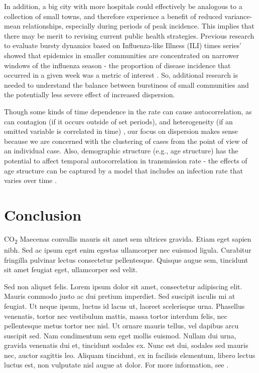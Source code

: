 \documentclass[10pt,letterpaper]{article}
\begin{document}
In addition, a big city with more hospitals could effectively be analogous to a collection of small towns, and therefore experience a benefit of reduced variance-mean relationships, especially during periods of peak incidence.
This implies that there may be merit to revising current public health strategies. 
Previous research to evaluate bursty dynamics based on Influenza-like Illness (ILI) times series’ showed that epidemics in smaller communities are concentrated on narrower windows of the influenza season - the proportion of disease incidence that occurred in a given week was a metric of interest \cite{dalziel_urbanization_2018}. 
So, additional research is needed to understand the balance between burstiness of small communities and the potentially less severe effect of increased dispersion.

Though some kinds of time dependence in the rate can cause autocorrelation, as can contagion (if it occurs outside of set periods), and heterogeneity (if an omitted variable is correlated in time) \cite{barron_analysis_1992}, our focus on dispersion makes sense because we are concerned with the clustering of cases from the point of view of an individual case. Also, demographic structure (e.g., age structure) has the potential to affect temporal autocorrelation in transmission rate - the effects of age structure can be captured by a model that includes an infection rate that varies over time \cite{earn_dynamic_nodate}. 

\section*{Conclusion}

CO\textsubscript{2} Maecenas convallis mauris sit amet sem ultrices gravida. Etiam eget sapien nibh. Sed ac ipsum eget enim egestas ullamcorper nec euismod ligula. Curabitur fringilla pulvinar lectus consectetur pellentesque. Quisque augue sem, tincidunt sit amet feugiat eget, ullamcorper sed velit. 

Sed non aliquet felis. Lorem ipsum dolor sit amet, consectetur adipiscing elit. Mauris commodo justo ac dui pretium imperdiet. Sed suscipit iaculis mi at feugiat. Ut neque ipsum, luctus id lacus ut, laoreet scelerisque urna. Phasellus venenatis, tortor nec vestibulum mattis, massa tortor interdum felis, nec pellentesque metus tortor nec nisl. Ut ornare mauris tellus, vel dapibus arcu suscipit sed. Nam condimentum sem eget mollis euismod. Nullam dui urna, gravida venenatis dui et, tincidunt sodales ex. Nunc est dui, sodales sed mauris nec, auctor sagittis leo. Aliquam tincidunt, ex in facilisis elementum, libero lectus luctus est, non vulputate nisl augue at dolor. For more information, see .
\end{document}
